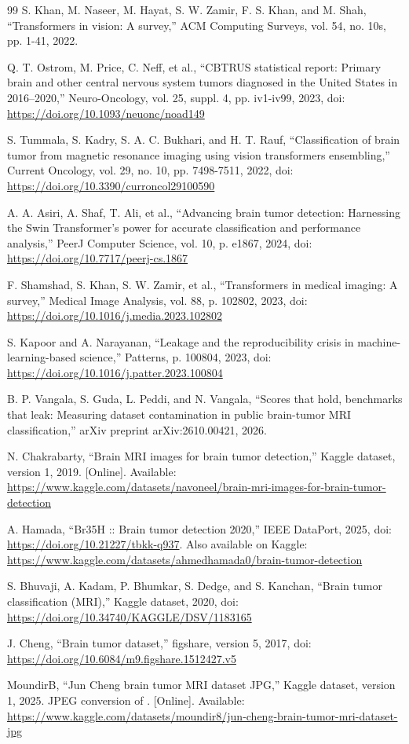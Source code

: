 \documentclass[final,3p,times,number]{elsarticle}
\begin{document}
\begin{thebibliography}{99}
 S. Khan, M. Naseer, M. Hayat, S. W. Zamir, F. S. Khan, and M. Shah, ``Transformers in vision: A survey,'' ACM Computing Surveys, vol. 54, no. 10s, pp. 1-41, 2022.

 Q. T. Ostrom, M. Price, C. Neff, et al., ``CBTRUS statistical report: Primary brain and other central nervous system tumors diagnosed in the United States in 2016--2020,'' Neuro-Oncology, vol. 25, suppl. 4, pp. iv1-iv99, 2023, doi: \url{https://doi.org/10.1093/neuonc/noad149}

 S. Tummala, S. Kadry, S. A. C. Bukhari, and H. T. Rauf, ``Classification of brain tumor from magnetic resonance imaging using vision transformers ensembling,'' Current Oncology, vol. 29, no. 10, pp. 7498-7511, 2022, doi: \url{https://doi.org/10.3390/curroncol29100590}

 A. A. Asiri, A. Shaf, T. Ali, et al., ``Advancing brain tumor detection: Harnessing the Swin Transformer's power for accurate classification and performance analysis,'' PeerJ Computer Science, vol. 10, p. e1867, 2024, doi: \url{https://doi.org/10.7717/peerj-cs.1867}

 F. Shamshad, S. Khan, S. W. Zamir, et al., ``Transformers in medical imaging: A survey,'' Medical Image Analysis, vol. 88, p. 102802, 2023, doi: \url{https://doi.org/10.1016/j.media.2023.102802}

 S. Kapoor and A. Narayanan, ``Leakage and the reproducibility crisis in machine-learning-based science,'' Patterns, p. 100804, 2023, doi: \url{https://doi.org/10.1016/j.patter.2023.100804}

 B. P. Vangala, S. Guda, L. Peddi, and N. Vangala, ``Scores that hold, benchmarks that leak: Measuring dataset contamination in public brain-tumor MRI classification,'' arXiv preprint arXiv:2610.00421, 2026.

 N. Chakrabarty, ``Brain MRI images for brain tumor detection,'' Kaggle dataset, version 1, 2019. [Online]. Available: \url{https://www.kaggle.com/datasets/navoneel/brain-mri-images-for-brain-tumor-detection}

 A. Hamada, ``Br35H :: Brain tumor detection 2020,'' IEEE DataPort, 2025, doi: \url{https://doi.org/10.21227/tbkk-q937}. Also available on Kaggle: \url{https://www.kaggle.com/datasets/ahmedhamada0/brain-tumor-detection}

 S. Bhuvaji, A. Kadam, P. Bhumkar, S. Dedge, and S. Kanchan, ``Brain tumor classification (MRI),'' Kaggle dataset, 2020, doi: \url{https://doi.org/10.34740/KAGGLE/DSV/1183165}

 J. Cheng, ``Brain tumor dataset,'' figshare, version 5, 2017, doi: \url{https://doi.org/10.6084/m9.figshare.1512427.v5}

 MoundirB, ``Jun Cheng brain tumor MRI dataset JPG,'' Kaggle dataset, version 1, 2025. JPEG conversion of \cite{ds4}. [Online]. Available: \url{https://www.kaggle.com/datasets/moundir8/jun-cheng-brain-tumor-mri-dataset-jpg}

\end{thebibliography}
\end{document}
